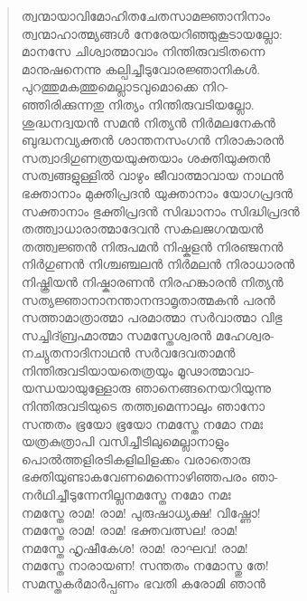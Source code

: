 \begin{verse}
ത്വന്മായാവിമോഹിതചേതസാമജ്ഞാനിനാം\\
ത്വന്മാഹാത്മ്യങ്ങള്‍ നേരേയറിഞ്ഞുകൂടായല്ലോ:\\
മാനസേ ചിശ്വാത്മാവാം നിന്തിരുവടിതന്നെ\\
മാനുഷനെന്നു കല്പിച്ചീടുവോരജ്ഞാനികള്‍.\\
പുറത്തുമകത്തുമെല്ലാടവുമൊക്കെ നിറ-\\
ഞ്ഞിരിക്കുന്നതു നിത്യം നിന്തിരുവടിയല്ലോ.\\
ശുദ്ധനദ്വയന്‍ സമന്‍ നിത്യന്‍ നിര്‍മലനേകന്‍\\
ബുദ്ധനവ്യക്തന്‍ ശാന്തനസംഗന്‍ നിരാകാരന്‍\\
സത്വാദിഗുണത്രയയുക്തയാം ശക്തിയുക്തന്‍\\
സത്വങ്ങളുള്ളില്‍ വാഴും ജീവാത്മാവായ നാഥന്‍\\
ഭക്താനാം മുക്തിപ്രദന്‍ യുക്താനാം യോഗപ്രദന്‍\\
സക്താനാം ഭുക്തിപ്രദന്‍ സിദ്ധാനാം സിദ്ധിപ്രദന്‍\\
തത്ത്വാധാരാത്മാദേവന്‍ സകലജഗന്മയന്‍\\
തത്ത്വജ്ഞന്‍ നിരുപമന്‍ നിഷ്കളന്‍ നിരഞ്ജനന്‍\\
നിര്‍ഗുണന്‍ നിശ്ചഞ്ചലന്‍ നിര്‍മലന്‍ നിരാധാരന്‍\\
നിഷ്ക്രിയന്‍ നിഷ്കാരണന്‍ നിരഹങ്കാരന്‍ നിത്യന്‍\\
സത്യജ്ഞാനാനന്താനന്ദാമൃതാത്മകന്‍ പരന്‍\\
സത്താമാത്രാത്മാ പരമാത്മാ സര്‍വാത്മാ വിഭു\\
സച്ചിദ്ബ്രഹ്മാത്മാ സമസ്തേശ്വരന്‍ മഹേശ്വര-\\
നച്യുതനാദിനാഥന്‍ സര്‍വദേവതാമന്‍\\
നിന്തിരുവടിയായതെത്രയും മൂഢാത്മാവാ-\\
യന്ധയായുള്ളോരു ഞാനെങ്ങനെയറിയുന്നു\\
നിന്തിരുവടിയുടെ തത്ത്വമെന്നാലും ഞാനോ\\
സന്തതം ഭൂയോ ഭൂയോ നമസ്തേ നമോ നമഃ\\
യത്രകുത്രാപി വസിച്ചീടിലുമെല്ലാനാളും\\
പൊല്‍ത്തളിരടികളിലിളക്കം വരാതൊരു\\
ഭക്തിയുണ്ടാകവേണമെന്നൊഴിഞ്ഞപരം ഞാ-\\
നര്‍ഥിച്ചീടുന്നേനില്ലനമസ്തേ നമോ നമഃ\\
നമസ്തേ രാമ! രാമ! പുരുഷാധ്യക്ഷ! വിഷ്ണോ!\\
നമസ്തേ രാമ! രാമ! ഭക്തവത്സല! രാമ!\\
നമസ്തേ ഹൃഷീകേശ! രാമ! രാഘവ! രാമ!\\
നമസ്തേ നാരായണ! സന്തതം നമോസ്തു തേ!\\
സമസ്തകര്‍മാര്‍പ്പണം ഭവതി കരോമി ഞാന്‍\\

\end{verse}
